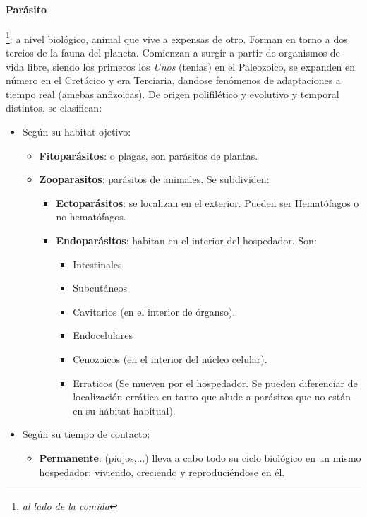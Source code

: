\documentclass[10pt,a4paper,onecolumn,openany]{book}
\begin{document}
\paragraph{Parásito}\footnote{\textit{al lado de la comida}}: a nivel biológico, animal que vive a expensas de otro. Forman en torno a dos tercios de la fauna del planeta. Comienzan a surgir a partir de organismos de vida libre, siendo los primeros los \textit{Unos} (tenias) en el Paleozoico, se expanden en número en el Cretácico y era Terciaria, dandose fenómenos de adaptaciones a tiempo real (amebas anfizoicas). De origen polifilético y evolutivo y temporal distintos, se clasifican:
\begin{itemize}[itemsep=0pt,parsep=0pt,topsep=0pt,partopsep=0pt]
	\item Según su habitat ojetivo:
	\begin{itemize}[itemsep=0pt,parsep=0pt,topsep=0pt,partopsep=0pt]
		\item \textbf{Fitoparásitos}: o plagas, son parásitos de plantas.
		\item\textbf{Zooparasitos}: parásitos de animales. Se subdividen:
		\begin{itemize}[itemsep=0pt,parsep=0pt,topsep=0pt,partopsep=0pt]
			\item \textbf{Ectoparásitos}: se localizan en el exterior. Pueden ser Hematófagos o no hematófagos.
			\item\textbf{Endoparásitos}: habitan en el interior del hospedador. Son:
			\begin{itemize}[itemsep=0pt,parsep=0pt,topsep=0pt,partopsep=0pt]
				\item Intestinales
				\item Subcutáneos
				\item Cavitarios (en el interior de órganso).
				\item Endocelulares
				\item Cenozoicos (en el interior del núcleo celular).
				\item Erraticos (Se mueven por el hospedador. Se pueden diferenciar de localización errática en tanto que alude a parásitos que no están en su hábitat habitual).
			\end{itemize}
		\end{itemize}
	\end{itemize}
	\item Según su tiempo de contacto:
	\begin{itemize}[itemsep=0pt,parsep=0pt,topsep=0pt,partopsep=0pt]
		\item \textbf{Permanente}: (piojos,$\dots$) lleva a cabo todo su ciclo biológico en un mismo hospedador: viviendo, creciendo y reproduciéndose en él.

\end{itemize}
\end{itemize}
\end{document}
